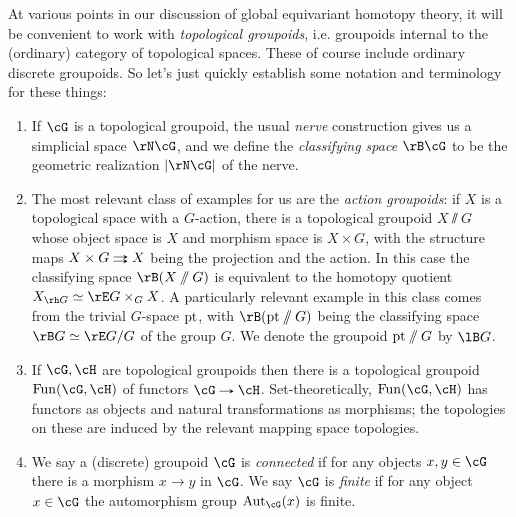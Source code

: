 \begin{notation}
  \label{global-topgpds}
  At various points in our discussion of global equivariant homotopy
  theory, it will be convenient to work with \emph{topological
    groupoids}, i.e. groupoids internal to the (ordinary) category of
  topological spaces. These of course include ordinary discrete
  groupoids. So let's just quickly establish some notation and
  terminology for these things:
  \begin{enumerate}
  \item If $\cG$ is a topological groupoid, the usual \emph{nerve}
    construction gives us a simplicial space $\rN\cG$, and we define
    the \emph{classifying space} $\rB\cG$ to be the geometric
    realization $|\rN\cG|$ of the nerve.
  \item The most relevant class of examples for us are the
    \emph{action groupoids}: if $X$ is a topological space with a
    $G$-action, there is a topological groupoid $X \sslash G$ whose
    object space is $X$ and morphism space is $X \times G$, with the
    structure maps $X \times G \doubto X$ being the projection and the
    action. In this case the classifying space $\rB(X \sslash G)$ is
    equivalent to the homotopy quotient
    $X_{\rh G} \iso \rE G \times_G X$. A particularly relevant example
    in this class comes from the trivial $G$-space $\mathrm{pt}$, with
    $\rB(\pt \sslash G)$ being the classifying space
    $\rB G \iso \rE G/G$ of the group $G$. We denote the groupoid
    $\mathrm{pt} \sslash G$ by $\lB G$.
  \item If $\cG,\cH$ are topological groupoids then there is a
    topological groupoid $\Fun(\cG,\cH)$ of functors $\cG \to \cH$.
    Set-theoretically, $\Fun(\cG,\cH)$ has functors as objects and
    natural transformations as morphisms; the topologies on these are
    induced by the relevant mapping space topologies.
  \item We say a (discrete) groupoid $\cG$ is \emph{connected} if for
    any objects $x,y \in \cG$ there is a morphism $x \to y$ in
    $\cG$. We say $\cG$ is \emph{finite} if for any object $x \in \cG$
    the automorphism group $\Aut_\cG(x)$ is finite.
  \end{enumerate}
\end{notation}

